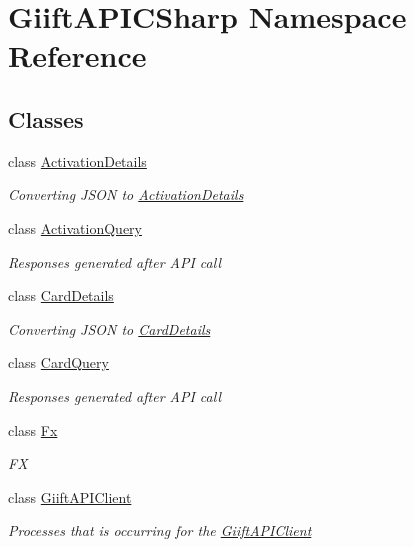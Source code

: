 \hypertarget{namespace_giift_a_p_i_c_sharp}{}\section{Giift\+A\+P\+I\+C\+Sharp Namespace Reference}
\label{namespace_giift_a_p_i_c_sharp}
\subsection*{Classes}
\begin{DoxyCompactItemize}
\item 
class \hyperlink{class_giift_a_p_i_c_sharp_1_1_activation_details}{Activation\+Details}
\begin{DoxyCompactList}\small\item\em Converting J\+S\+ON to \hyperlink{class_giift_a_p_i_c_sharp_1_1_activation_details}{Activation\+Details} \end{DoxyCompactList}\item 
class \hyperlink{class_giift_a_p_i_c_sharp_1_1_activation_query}{Activation\+Query}
\begin{DoxyCompactList}\small\item\em Responses generated after A\+PI call \end{DoxyCompactList}\item 
class \hyperlink{class_giift_a_p_i_c_sharp_1_1_card_details}{Card\+Details}
\begin{DoxyCompactList}\small\item\em Converting J\+S\+ON to \hyperlink{class_giift_a_p_i_c_sharp_1_1_card_details}{Card\+Details} \end{DoxyCompactList}\item 
class \hyperlink{class_giift_a_p_i_c_sharp_1_1_card_query}{Card\+Query}
\begin{DoxyCompactList}\small\item\em Responses generated after A\+PI call \end{DoxyCompactList}\item 
class \hyperlink{class_giift_a_p_i_c_sharp_1_1_fx}{Fx}
\begin{DoxyCompactList}\small\item\em FX \end{DoxyCompactList}\item 
class \hyperlink{class_giift_a_p_i_c_sharp_1_1_giift_a_p_i_client}{Giift\+A\+P\+I\+Client}
\begin{DoxyCompactList}\small\item\em Processes that is occurring for the \hyperlink{class_giift_a_p_i_c_sharp_1_1_giift_a_p_i_client}{Giift\+A\+P\+I\+Client} \end{DoxyCompactList}\item 

\end{DoxyCompactItemize}
